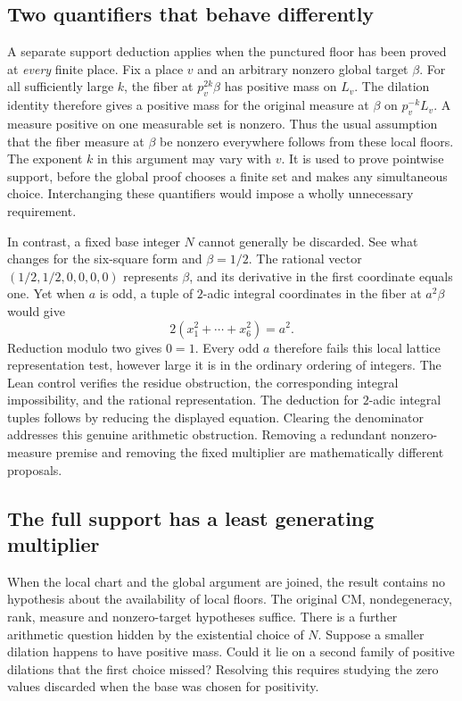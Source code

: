 \documentclass[12pt,letterpaper]{article}
\begin{document}
\subsection{Two quantifiers that behave differently}

A separate support deduction applies when the punctured floor has been proved at \emph{every} finite place. Fix a place $v$ and an arbitrary nonzero global target $\beta$. For all sufficiently large $k$, the fiber at $p_v^{2k}\beta$ has positive mass on $L_v$. The dilation identity therefore gives a positive mass for the original measure at $\beta$ on $p_v^{-k}L_v$. A measure positive on one measurable set is nonzero. Thus the usual assumption that the fiber measure at $\beta$ be nonzero everywhere follows from these local floors. The exponent $k$ in this argument may vary with $v$. It is used to prove pointwise support, before the global proof chooses a finite set and makes any simultaneous choice. Interchanging these quantifiers would impose a wholly unnecessary requirement.

In contrast, a fixed base integer $N$ cannot generally be discarded. See what changes for the six-square form and $\beta=1/2$. The rational vector $(1/2,1/2,0,0,0,0)$ represents $\beta$, and its derivative in the first coordinate equals one. Yet when $a$ is odd, a tuple of $2$-adic integral coordinates in the fiber at $a^2\beta$ would give
\[
      2(x_1^2+\cdots+x_6^2)=a^2.
\]
Reduction modulo two gives $0=1$. Every odd $a$ therefore fails this local lattice representation test, however large it is in the ordinary ordering of integers. The Lean control verifies the residue obstruction, the corresponding integral impossibility, and the rational representation. The deduction for $2$-adic integral tuples follows by reducing the displayed equation. Clearing the denominator addresses this genuine arithmetic obstruction. Removing a redundant nonzero-measure premise and removing the fixed multiplier are mathematically different proposals.

\subsection{The full support has a least generating multiplier}

When the local chart and the global argument are joined, the result contains no hypothesis about the availability of local floors. The original CM, nondegeneracy, rank, measure and nonzero-target hypotheses suffice. There is a further arithmetic question hidden by the existential choice of $N$. Suppose a smaller dilation happens to have positive mass. Could it lie on a second family of positive dilations that the first choice missed? Resolving this requires studying the zero values discarded when the base was chosen for positivity.
\end{document}
